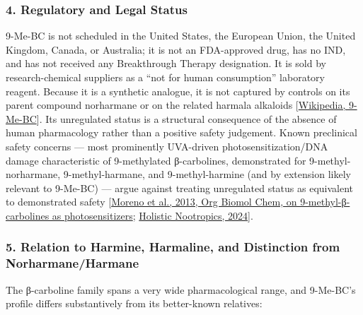 \subsubsection{4. Regulatory and Legal Status}\label{20_ibogaine-regulatory-and-legal-status}

9-Me-BC is not scheduled in the United States, the European Union, the United Kingdom, Canada, or Australia; it is not an FDA-approved drug, has no IND, and has not received any Breakthrough Therapy designation. It is sold by research-chemical suppliers as a ``not for human consumption'' laboratory reagent. Because it is a synthetic analogue, it is not captured by controls on its parent compound norharmane or on the related harmala alkaloids {[}\href{https://en.wikipedia.org/wiki/9-Methyl-\%CE\%B2-carboline}{Wikipedia, 9-Me-BC}{]}. Its unregulated status is a structural consequence of the absence of human pharmacology rather than a positive safety judgement. Known preclinical safety concerns --- most prominently UVA-driven photosensitization/DNA damage characteristic of 9-methylated β-carbolines, demonstrated for 9-methyl-norharmane, 9-methyl-harmane, and 9-methyl-harmine (and by extension likely relevant to 9-Me-BC) --- argue against treating unregulated status as equivalent to demonstrated safety {[}\href{https://www.researchgate.net/publication/5932301_9-Methyl-beta-carboline_up-regulates_the_appearance_of_differentiated_dopaminergic_neurones_in_primary_mesencephalic_culture}{Moreno et al., 2013, Org Biomol Chem, on 9-methyl-β-carbolines as photosensitizers}; \href{https://holisticnootropics.com/substances/9-methyl-carboline/}{Holistic Nootropics, 2024}{]}.

\subsubsection{5. Relation to Harmine, Harmaline, and Distinction from Norharmane/Harmane}\label{20_ibogaine-relation-to-harmine-harmaline-and-distinction-from-norharmaneharmane}

The β-carboline family spans a very wide pharmacological range, and 9-Me-BC's profile differs substantively from its better-known relatives:

